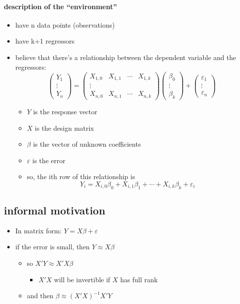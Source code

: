 \paragraph{description of the ``environment''}
\begin{itemize}
\item have n data points (observations)
\item have k+1 regressors
\item believe that there's a relationship between the dependent
        variable and the regressors:
        \[\begin{pmatrix} Y_1 \\ \vdots \\ Y_n\end{pmatrix}
        = \begin{pmatrix} 
        X_{1,0} & X_{1,1} & \cdots & X_{1,k} \\
        \vdots \\
        X_{n,0} & X_{n,1} & \cdots & X_{n,k} \end{pmatrix}
        \begin{pmatrix}  \beta_0 \\ \vdots \\ \beta_k \end{pmatrix}+ 
        \begin{pmatrix} \varepsilon_1 \\ \vdots \\
          \varepsilon_n \end{pmatrix} \]
\begin{itemize}
\item $Y$ is the response vector
\item $X$ is the design matrix
\item $\beta$ is the vector of unknown coefficients
\item $\varepsilon$ is the error
\item so, the ith row of this relationship is
            \[Y_i = X_{i,0} \beta_0 + X_{i,1} \beta_1 + \cdots + X_{i,k}
            \beta_k + \varepsilon_i\]
\end{itemize}
\end{itemize}

\subsection{informal motivation}
\begin{itemize}
\item In matrix form: $Y = X \beta + \varepsilon$
\item if the error is small, then $Y \approx X\beta$
\begin{itemize}
\item so $X'Y \approx X'X \beta$
\begin{itemize}
\item $X'X$ will be invertible if $X$ has full rank
\end{itemize}
\item and then $\beta \approx (X'X)^{-1} X'Y$
\end{itemize}
\end{itemize}

